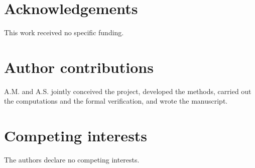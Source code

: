 \documentclass[11pt]{article}
\begin{document}
\begingroup
\small
\singlespacing
\setlength{\bibsep}{1.5pt}


\endgroup

\section*{Acknowledgements}
This work received no specific funding.

\section*{Author contributions}
A.M. and A.S. jointly conceived the project, developed the methods, carried out the computations and the formal verification, and wrote the manuscript.

\section*{Competing interests}
The authors declare no competing interests.
\end{document}
